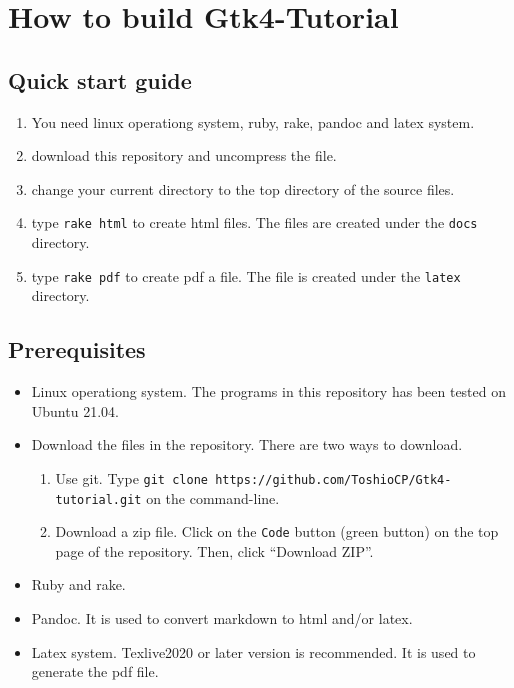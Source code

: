 \section{How to build Gtk4-Tutorial}\label{how-to-build-gtk4-tutorial}

\subsection{Quick start guide}\label{quick-start-guide}

\begin{enumerate}
\def\labelenumi{\arabic{enumi}.}
\tightlist
\item
  You need linux operationg system, ruby, rake, pandoc and latex system.
\item
  download this repository and uncompress the file.
\item
  change your current directory to the top directory of the source
  files.
\item
  type \texttt{rake\ html} to create html files. The files are created
  under the \texttt{docs} directory.
\item
  type \texttt{rake\ pdf} to create pdf a file. The file is created
  under the \texttt{latex} directory.
\end{enumerate}

\subsection{Prerequisites}\label{prerequisites}

\begin{itemize}
\tightlist
\item
  Linux operationg system. The programs in this repository has been
  tested on Ubuntu 21.04.
\item
  Download the files in the repository. There are two ways to download.

  \begin{enumerate}
  \def\labelenumi{\arabic{enumi}.}
  \tightlist
  \item
    Use git. Type
    \texttt{git\ clone\ https://github.com/ToshioCP/Gtk4-tutorial.git}
    on the command-line.
  \item
    Download a zip file. Click on the \texttt{Code} button (green
    button) on the top page of the repository. Then, click ``Download
    ZIP''.
  \end{enumerate}
\item
  Ruby and rake.
\item
  Pandoc. It is used to convert markdown to html and/or latex.
\item
  Latex system. Texlive2020 or later version is recommended. It is used
  to generate the pdf file.
\end{itemize}

